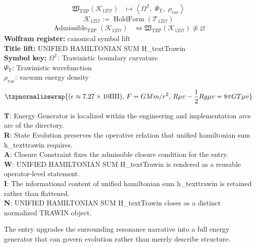 \noindent
\begin{minipage}[t]{0.48\linewidth}
\begingroup
\small
\[
\begin{aligned}
\mathfrak{W}_{\mathrm{TZP}}\!\left(\mathcal{K}_{1257}\right)
&\longmapsto
\left\langle \Omega^{\mathbb{T}},\; \Psi_{\mathrm{T}},\; \rho_{\mathrm{vac}} \right\rangle
\end{aligned}
\]
\[
\mathcal{K}_{1257}
:=
\operatorname{HoldForm}\!\left(\mathcal{T}_{1257}\right)
\]
\[
\begin{aligned}
\operatorname{Admissible}_{\mathrm{TZP}}\!\left(\mathcal{K}_{1257}\right)
&\Longleftrightarrow
\mathfrak{W}_{\mathrm{TZP}}\!\left(\mathcal{K}_{1257}\right)\not\equiv\varnothing
\end{aligned}
\]
\textbf{Wolfram register:} canonical symbol lift\\
\textbf{Title lift:} UNIFIED HAMILTONIAN SUM H\_textTrawin\\
\textbf{Symbol key:} \(\Omega^{\mathbb{T}}\): Trawinistic boundary curvature\\ \(\Psi_{\mathrm{T}}\): Trawinistic wavefunction\\ \(\rho_{\mathrm{vac}}\): vacuum energy density
\par
\endgroup
\end{minipage}\hfill
\begin{minipage}[t]{0.48\linewidth}
\[
\tzpnormalizewrap{(\epsilon\approx7.27\times10\Pi\Pi),\,F=GMm/r^{2},\,R\mu v-\frac{1}{2}Rg\mu v=8\pi GT\mu v}
\]

\small
\textbf{T}: Energy Generator is localized within the engineering and implementation arcs arc of the directory.\\
\textbf{R}: State Evolution preserves the operative relation that unified hamiltonian sum h\_texttrawin requires.\\
\textbf{A}: Closure Constraint fixes the admissible closure condition for the entry.\\
\textbf{W}: UNIFIED HAMILTONIAN SUM H\_textTrawin is rendered as a reusable operator-level statement.\\
\textbf{I}: The informational content of unified hamiltonian sum h\_texttrawin is retained rather than flattened.\\
\textbf{N}: UNIFIED HAMILTONIAN SUM H\_textTrawin closes as a distinct normalized TRAWIN object.
\normalsize
\end{minipage}

The entry upgrades the surrounding resonance narrative into a full energy generator that can govern evolution rather than merely describe structure.
\clearpage

